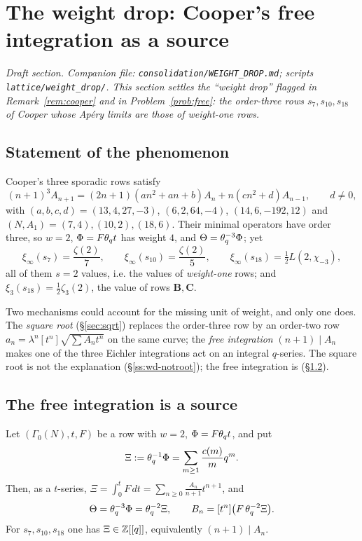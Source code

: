 \section{The weight drop: Cooper's free integration as a source}\label{sec:weightdrop}

\emph{Draft section.  Companion file: \texttt{consolidation/WEIGHT\_DROP.md};
scripts \texttt{lattice/weight\_drop/}.  This section settles the
``weight drop'' flagged in Remark~\ref{rem:cooper} and in
Problem~\ref{prob:free}: the order-three rows $s_7,s_{10},s_{18}$ of Cooper
whose Ap\'ery limits are those of \emph{weight-one} rows.}

\subsection{Statement of the phenomenon}

Cooper's three sporadic rows satisfy
\[
(n+1)^3A_{n+1}=(2n+1)(an^2+an+b)A_n+n(cn^2+d)A_{n-1},\qquad d\neq0,
\]
with $(a,b,c,d)=(13,4,27,-3)$, $(6,2,64,-4)$, $(14,6,-192,12)$ and
$(N,A_1)=(7,4),(10,2),(18,6)$.  Their minimal operators have order three, so
$w=2$, $\Phi=F\theta_q t$ has weight $4$, and $\Theta=\theta_q^{-3}\Phi$; yet
\[
\xi_\infty(s_7)=\frac{\zeta(2)}7,\qquad
\xi_\infty(s_{10})=\frac{\zeta(2)}5,\qquad
\xi_\infty(s_{18})=\tfrac12L(2,\chi_{-3}),
\]
all of them $s=2$ values, i.e. the values of \emph{weight-one} rows; and
$\xi_3(s_{18})=\tfrac12\zeta_3(2)$, the value of rows $\mathbf B,\mathbf C$.

Two mechanisms could account for the missing unit of weight, and only one does.
The \emph{square root} (\S\ref{sec:sqrt}) replaces the order-three row by an
order-two row $a_n=\lambda^n[t^n]\sqrt{\sum A_nt^n}$ on the same curve; the
\emph{free integration} $(n+1)\mid A_n$ \cite{Bogner2013} makes one of the three
Eichler integrations act on an integral $q$-series.  The square root is not the
explanation (\S\ref{ss:wd-notroot}); the free integration is (\S\ref{ss:wd-Xi}).

\subsection{The free integration is a source}\label{ss:wd-Xi}

\begin{theorem}\label{thm:WD1}
Let $(\Gamma_0(N),t,F)$ be a row with $w=2$, $\Phi=F\theta_q t$, and put
\[
\Xi:=\theta_q^{-1}\Phi=\sum_{m\ge1}\frac{c(m)}{m}q^m .
\]
Then, as a $t$-series, $\Xi=\int_0^tF\,dt=\sum_{n\ge0}\frac{A_n}{n+1}t^{n+1}$, and
\[
\Theta=\theta_q^{-3}\Phi=\theta_q^{-2}\Xi,\qquad
B_n=[t^n]\bigl(F\,\theta_q^{-2}\Xi\bigr).
\]
For $s_7,s_{10},s_{18}$ one has $\Xi\in\mathbb{Z}[[q]]$, equivalently $(n+1)\mid A_n$.
\end{theorem}

